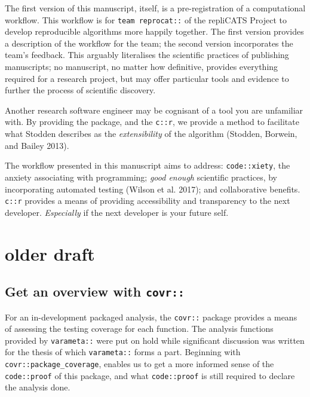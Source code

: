 \documentclass[
]{article}
\begin{document}
The first version of this manuscript, itself, is a pre-registration of a
computational workflow. This workflow is for \texttt{team\ reprocat::}
of the repliCATS Project to develop reproducible algorithms more happily
together. The first version provides a description of the workflow for
the team; the second version incorporates the team's feedback. This
arguably literalises the scientific practices of publishing manuscripts;
no manuscript, no matter how definitive, provides everything required
for a research project, but may offer particular tools and evidence to
further the process of scientific discovery.

Another research software engineer may be cognisant of a tool you are
unfamiliar with. By providing the package, and the \texttt{c::r}, we
provide a method to facilitate what Stodden describes as the
\emph{extensibility} of the algorithm (Stodden, Borwein, and Bailey
2013).

The workflow presented in this manuscript aims to address:
\texttt{code::xiety}, the anxiety associating with programming;
\emph{good enough} scientific practices, by incorporating automated
testing (Wilson et al. 2017); and collaborative benefits. \texttt{c::r}
provides a means of providing accessibility and transparency to the next
developer. \emph{Especially} if the next developer is your future self.

\hypertarget{older-draft}{%
\section{older draft}\label{older-draft}}

\hypertarget{get-an-overview-with-covr}{%
\subsection{\texorpdfstring{Get an overview with
\texttt{covr::}\label{sec: covr}}{Get an overview with covr::}}\label{get-an-overview-with-covr}}

For an in-development packaged analysis, the \texttt{covr::} package
provides a means of assessing the testing coverage for each function.
The analysis functions provided by \texttt{varameta::} were put on hold
while significant discussion was written for the thesis of which
\texttt{varameta::} forms a part. Beginning with
\texttt{covr::package\_coverage}, enables us to get a more informed
sense of the \texttt{code::proof} of this package, and what
\texttt{code::proof} is still required to declare the analysis done.
\end{document}
